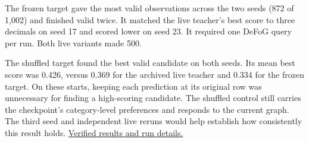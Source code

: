 \documentclass[11pt,a4paper]{article}
\newcommand{\footlink}[2]{\href{#1}{#2}}
\begin{document}
The frozen target gave the most valid observations across the two seeds (872 of 1,002) and finished valid twice. It matched the live teacher's best score to three decimals on seed 17 and scored lower on seed 23. It required one DeFoG query per run. Both live variants made 500.

The shuffled target found the best valid candidate on both seeds. Its mean best score was 0.426, versus 0.369 for the archived live teacher and 0.334 for the frozen target. On these starts, keeping each prediction at its original row was unnecessary for finding a high-scoring candidate. The shuffled control still carries the checkpoint's category-level preferences and responds to the current graph. The third seed and independent live reruns would help establish how consistently this result holds. \footlink{run:../experiments/learned-prior/protenix-defog-composition-30000/teacher-mechanism-20261125.md}{Verified results and run details.}
\end{document}
